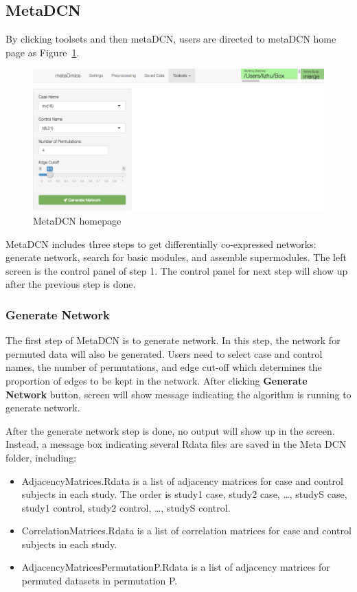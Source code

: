 \subsection{MetaDCN}
By clicking toolsets and then metaDCN,
users are directed to metaDCN home page as Figure~\ref{fig:metaDCNHome}.

\begin{figure}[H]
\begin{center}
\includegraphics[scale=0.8]{./figure/metaDCN/metaDCNHome}
\caption{MetaDCN homepage}
\label{fig:metaDCNHome}
\end{center}
\end{figure}

MetaDCN includes three steps to get differentially co-expressed networks: generate network, search for basic modules, and assemble supermodules. The left screen is the control panel of step 1. The control panel for next step will show up after the previous step is done.

\subsubsection{Generate Network}
The first step of MetaDCN is to generate network. In this step, the network for permuted data will also be generated. Users need to select case and control names, the number of permutations, and edge cut-off which determines the proportion of edges to be kept in the network. After clicking \textbf{Generate Network} button, screen will show message indicating the algorithm is running to generate network.

After the generate network step is done, no output will show up in the screen. Instead, a message box indicating several Rdata files are saved in the Meta DCN folder, including:

\begin{itemize}
\item AdjacencyMatrices.Rdata is a list of adjacency matrices for case and control subjects in each study. The order is study1 case, study2 case, \dots, studyS case, study1 control, study2 control, \dots, studyS control.
\item CorrelationMatrices.Rdata is a list of correlation matrices for case and control subjects in each study.
\item AdjacencyMatricesPermutationP.Rdata is a list of adjacency matrices for permuted datasets in permutation P.
\end{itemize}

